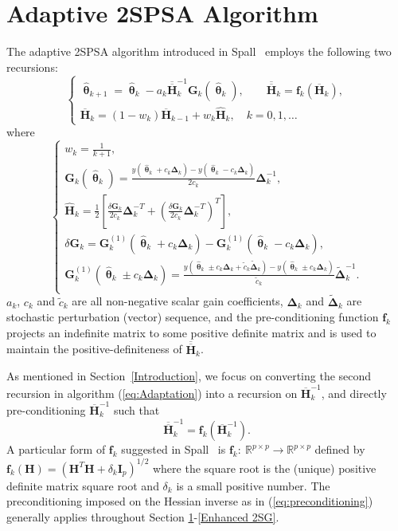 \documentclass[conference]{IEEEtran}
\newcommand{\bG}{\bm{G}}
\newcommand{\bDelta}{\bm{\Delta}}
\newcommand{\oH}{\bm{\overline{H}}}
\newcommand{\ooH}{\bm{\overline{\overline{H}}}}
\newcommand{\hH}{\bm{\hat{H}}}
\newcommand{\htheta}{\bm{\hat{\uptheta}}}
\newcommand{\tDelta}{\bm{\tilde{\Delta}}}
\begin{document}
\section{Adaptive 2SPSA Algorithm}
\label{2SPSA}
The adaptive 2SPSA algorithm introduced in Spall~\cite{Spall2000} employs the following
two recursions:
\begin{equation} \label{eq:Adaptation}
  \begin{cases}
    \htheta_{k+1}=\htheta_k-a_k\ooH_k^{-1} \bG_k(\htheta_k),
  \qquad \bm{\ooH}_k=\bm{f}_k(\oH_k),\\ \oH_k= (1 - w_k) \oH_{k-1}+ w_k \hH_k,
 \quad k=0,1,\dots
  \end{cases}
\end{equation}
where
\begin{equation} \label{eq:notations}
  \begin{cases} w_k=\frac{1}{k+1},\\
    \bG_k(\htheta_k)=\frac{y(\htheta_k+c_k\bDelta_k)-y(\htheta_k-c_k\bDelta_k)}{2c_k}\bDelta_k^{-1},\\
    \hH_k=\frac{1}{2}\left[
      \frac{\delta\bG_k}{2c_k}\bDelta_k^{-T}+\left(\frac{\delta\bG_k}{2c_k}\bDelta_k^{-T}\right)^T \right],\\
    \delta\bG_k=\bG_k^{(1)}(\htheta_k+ c_k\bDelta_k)-\bG_k^{(1)}(\htheta_k- c_k\bDelta_k),\\
    \bG_k^{(1)}(\htheta_k\pm c_k\bDelta_k) =\frac{y(\htheta_k\pm c_k\bDelta_k+\tilde{c}_k\tDelta_k)-y(\htheta_k\pm c_k\bDelta_k)}{\tilde{c}_k}\tDelta_k^{-1}.\\
  \end{cases}
\end{equation} $ a_k $, $ c_k $ and $ \tilde{c}_k $ are all
non-negative scalar gain coefficients, $ \bDelta_k $ and $ \tDelta_k $
are stochastic perturbation (vector) sequence, and the
pre-conditioning function $ \bm{f}_k $ projects an indefinite matrix
to some positive definite matrix and is used to maintain the
positive-definiteness of $\ooH_k$.

As mentioned in Section~\ref{Introduction}, we focus on
converting the second recursion in algorithm (\ref{eq:Adaptation})
into a recursion on $\oH_k^{-1}$, and directly pre-conditioning $\oH_k^{-1}$ such that
\begin{equation} \label{eq:preconditioning}
  \bm{\ooH}_k^{-1}=\bm{f}_k(\oH_k^{-1}).
\end{equation} A particular form of $\bm{f}_k$ suggested in
Spall~\cite{Spall2009} is $\bm{f}_k:~\mathbb{R}^{p\times p} \to \mathbb{R}^{p\times p}$ defined by
$\bm{f}_k(\bm{H})=(\bm{H}^{T}\bm{H}+\delta_k \bm{I}_p)^{1/2}$ where
the square root is the (unique) positive definite matrix square root and
$\delta_k$ is a small positive number. The preconditioning imposed on
the Hessian inverse as in (\ref{eq:preconditioning}) generally applies
throughout Section \ref{2SPSA}-\ref{Enhanced 2SG}.
\end{document}
